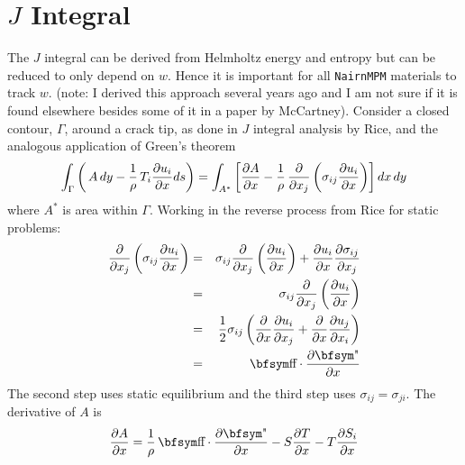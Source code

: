 \documentclass[11pt]{book}
\def\st{{\hbox{\bfsym\char'033}}}
\def\et{{\hbox{\bfsym\char'042}}}
\begin{document}
\section{$J$ Integral}

The $J$ integral can be derived from Helmholtz energy and entropy but can be reduced to only depend on $w$. Hence it is important for all {\tt NairnMPM} materials to track $w$. (note: I derived this approach several years ago and I am not sure if it is found elsewhere besides some of it in a paper by McCartney). Consider a closed contour, $\Gamma$, around a crack tip, as done in  $J$ integral analysis by Rice, and the analogous application of Green's theorem
\begin{equation}%
     \int_\Gamma \left(\thinspace A\thinspace dy
                           - {1\over\rho}\thinspace T_i {\partial u_i\over \partial x} ds\right)
     = \int_{A^*} \left[  {\partial A\over \partial x} -{1\over\rho}\thinspace
                 {\partial\over \partial x_j} \left(\sigma_{ij} {\partial u_i\over\partial x}\right)\right]dx\thinspace dy
                   \label{GreensA}
\end{equation}%
where $A^*$ is area within $\Gamma$. Working in the reverse process from Rice for static problems:
\begin{eqnarray}%
       {\partial\over\partial x_j}\left( \sigma_{ij}{\partial u_i\over\partial x}\right)
                 & = &    \sigma_{ij}  {\partial\over\partial x_j}\left({\partial u_i\over\partial x}\right)
                     +  {\partial u_i\over\partial x}{\partial\sigma_{ij}\over\partial x_j}   \\
                 & = & \sigma_{ij}  {\partial\over\partial x_j}\left({\partial u_i\over\partial x}\right) \\
                 & = & {1\over 2} \sigma_{ij}
                       \left({\partial\over\partial x}{\partial u_i\over\partial x_j}
                          + {\partial\over\partial x}{\partial u_j\over\partial x_i}\right) \\
                  & = & \st \cdot {\partial\et\over\partial x}
\end{eqnarray}%
The second step uses static equilibrium and the third step uses $\sigma_{ij}=\sigma_{ji}$. The derivative of $A$ is
\begin{equation}%
    {\partial A\over\partial x}  = {1\over \rho}\thinspace \st\cdot {\partial\et\over\partial x}
                - S {\partial T\over\partial x} - T  {\partial S_i\over\partial x}
\end{equation}%
\end{document}

